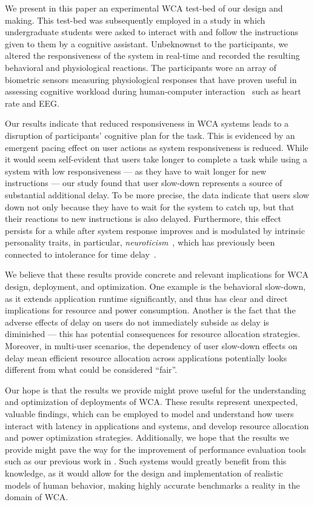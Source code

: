 \documentclass[10pt,letterpaper]{article}
\begin{document}
We present in this paper an experimental WCA test-bed of our design and making.
This test-bed was subsequently employed in a study in which undergraduate students were asked to interact with and follow the instructions given to them by a cognitive assistant.
Unbeknownst to the participants, we altered the responsiveness of the system in real-time and recorded the resulting behavioral and physiological reactions. 
The participants wore an array of biometric sensors measuring physiological responses that have proven useful in assessing cognitive workload during human-computer interaction~\autocite{haapalainen2010psycho,kumar2016measurement} such as heart rate and EEG.\@

Our results indicate that reduced responsiveness in WCA systems leads to a disruption of participants' cognitive plan for the task.
This is evidenced by an emergent pacing effect on user actions as system responsiveness is reduced.
While it would seem self-evident that users take longer to complete a task while using a system with low responsiveness --- as they have to wait longer for new instructions --- our study found that user slow-down represents a source of substantial additional delay.
To be more precise, the data indicate that users slow down not only because they have to wait for the system to catch up, but that their reactions to new instructions is also delayed.
Furthermore, this effect persists for a while after system response improves and is modulated by intrinsic personality traits, in particular, \emph{neuroticism}~\autocite{john1999:bfi}, which has previously been connected to intolerance for time delay~\autocite{hirsh2008delay}. 

We believe that these results provide concrete and relevant implications for WCA design, deployment, and optimization.
One example is the behavioral slow-down, as it extends application runtime significantly, and thus has clear and direct implications for resource and power consumption.
Another is the fact that the adverse effects of delay on users do not immediately subside as delay is diminished --- this has potential consequences for resource allocation strategies.
Moreover, in multi-user scenarios, the dependency of user slow-down effects on delay mean efficient resource allocation across applications potentially looks different from what could be considered ``fair''.

Our hope is that the results we provide might prove useful for the understanding and optimization of deployments of WCA.\@
These results represent unexpected, valuable findings, which can be employed to model and understand how users interact with latency in applications and systems, and develop resource allocation and power optimization strategies.
Additionally, we hope that the results we provide might pave the way for the improvement of performance evaluation tools such as our previous work in \textcite{olguin:2018, olguin:2019}.
Such systems would greatly benefit from this knowledge, as it would allow for the design and implementation of realistic models of human behavior, making highly accurate benchmarks a reality in the domain of WCA.\@
\end{document}
